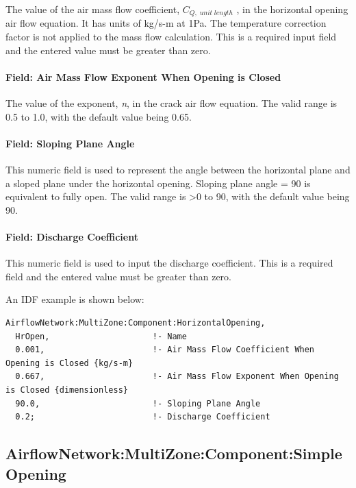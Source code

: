 The value of the air mass flow coefficient, \({C_{Q,\;unit\;length}}\) , in the horizontal opening air flow equation. It has units of kg/s-m at 1Pa. The temperature correction factor is not applied to the mass flow calculation. This is a required input field and the entered value must be greater than zero.

\paragraph{Field: Air Mass Flow Exponent When Opening is Closed}\label{field-air-mass-flow-exponent-when-opening-is-closed-1}

The value of the exponent, \emph{n}, in the crack air flow equation. The valid range is 0.5 to 1.0, with the default value being 0.65.

\paragraph{Field: Sloping Plane Angle}\label{field-sloping-plane-angle}

This numeric field is used to represent the angle between the horizontal plane and a sloped plane under the horizontal opening. Sloping plane angle = 90 is equivalent to fully open. The valid range is \textgreater{}0 to 90, with the default value being 90.

\paragraph{Field: Discharge Coefficient}\label{field-discharge-coefficient-1}

This numeric field is used to input the discharge coefficient. This is a required field and the entered value must be greater than zero.

An IDF example is shown below:

\begin{lstlisting}
AirflowNetwork:MultiZone:Component:HorizontalOpening,
  HrOpen,                     !- Name
  0.001,                      !- Air Mass Flow Coefficient When Opening is Closed {kg/s-m}
  0.667,                      !- Air Mass Flow Exponent When Opening is Closed {dimensionless}
  90.0,                       !- Sloping Plane Angle
  0.2;                        !- Discharge Coefficient
\end{lstlisting}

\subsection{AirflowNetwork:MultiZone:Component:SimpleOpening}\label{airflownetworkmultizonecomponentsimpleopening}

